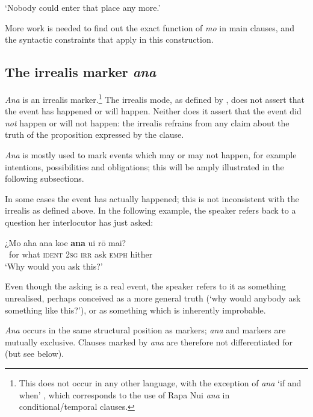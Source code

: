 \glt
‘Nobody could enter that place any more.’ \textstyleExampleref{[R310.158]}\textstyleExampleref{} 
\z

More work is needed to find out the exact function of \textit{mo} in main clauses, and the syntactic constraints that apply in this construction.

\subsection{The irrealis marker \textit{ana}}\label{sec:11.5.2}
\textit{Ana} is an irrealis marker.\footnote{\label{fn:521}This  does not occur in any other language, with the exception of  \textit{ana} ‘if and when’ \citep[130]{Biggs1973}, which corresponds to the use of Rapa Nui \textit{ana} in conditional/temporal clauses.} The irrealis mode, as defined by \citet[244]{Payne1997}, does not assert that the event has happened or will happen. Neither does it assert that the event did \textit{not} happen or will not happen: the irrealis refrains from any claim about the truth of the proposition expressed by the clause. 

\textit{Ana} is mostly used to mark events which may or may not happen, for example intentions, possibilities and obligations; this will be amply illustrated in the following subsections.

In some cases the event has actually happened; this is not inconsistent with the irrealis as defined above. In the following example, the speaker refers back to a question her interlocutor has just asked:

\ea\label{ex:11.164}
\gll ¿Mo aha {\ꞌ}ana koe \textbf{ana} {\ꞌ}ui rō mai?\\
~for what \textsc{ident} \textsc{2sg} \textsc{irr} ask \textsc{emph} hither\\

\glt
‘Why would you ask this?’ \textstyleExampleref{[R315.028]} 
\z

Even though the asking is a real event, the speaker refers to it as something unrealised, perhaps conceived as a more general truth (‘why would anybody ask something like this?’), or as something which is inherently improbable.

\textit{Ana} occurs in the same structural position as  markers; \textit{ana} and  markers are mutually exclusive. Clauses marked by \textit{ana} are therefore not differentiated for  (but see  below).

